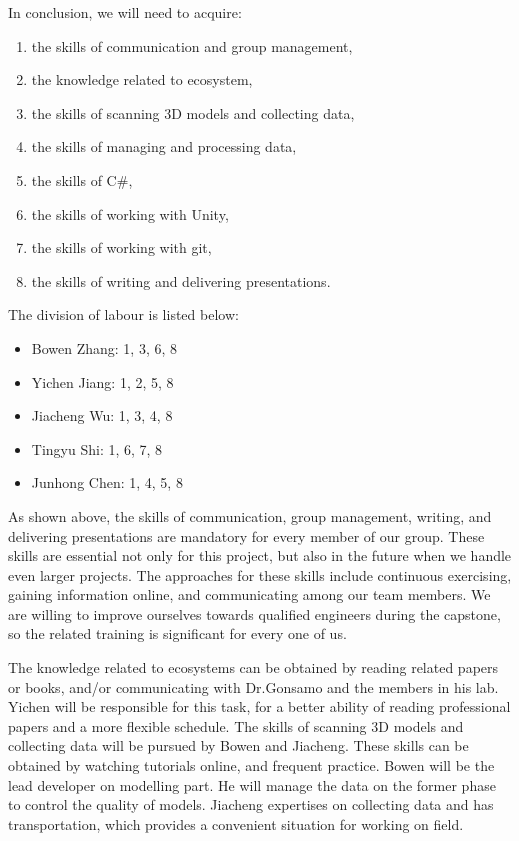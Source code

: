 \documentclass{article}
\begin{document}
In conclusion, we will need to acquire: 
\begin{enumerate}
    \item the skills of communication and group management,
    \item the knowledge related to ecosystem,
    \item the skills of scanning 3D models and collecting data,
    \item the skills of managing and processing data,
    \item the skills of C\#,
    \item the skills of working with Unity,
    \item the skills of working with git,
    \item the skills of writing and delivering presentations.
\end{enumerate}

The division of labour is listed below:
\begin{itemize}
    \item Bowen Zhang: 1, 3, 6, 8
    \item Yichen Jiang: 1, 2, 5, 8
    \item Jiacheng Wu: 1, 3, 4, 8
    \item Tingyu Shi: 1, 6, 7, 8
    \item Junhong Chen: 1, 4, 5, 8
\end{itemize}

As shown above, the skills of communication, group management, writing, and delivering presentations are mandatory for every member of our group. These skills are essential not only for this project, but also in the future when we handle even larger projects. The approaches for these skills include continuous exercising, gaining information online, and communicating among our team members. We are willing to improve ourselves towards qualified engineers during the capstone, so the related training is significant for every one of us. 

The knowledge related to ecosystems can be obtained by reading related papers or books, and/or communicating with Dr.Gonsamo and the members in his lab. Yichen will be responsible for this task, for a better ability of reading professional papers and a more flexible schedule. 
The skills of scanning 3D models and collecting data will be pursued by Bowen and Jiacheng. These skills can be obtained by watching tutorials online, and frequent practice. Bowen will be the lead developer on modelling part. He will manage the data on the former phase to control the quality of models. Jiacheng expertises on collecting data and has transportation, which provides a convenient situation for working on field.
\end{document}
